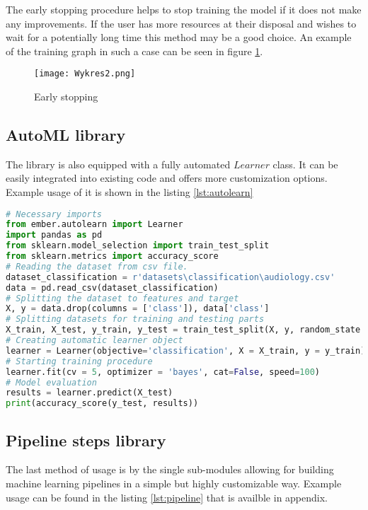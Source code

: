 \documentclass[a4paper,twoside,12pt]{book}
\begin{document}
The early stopping procedure helps to stop training the model if it does not make any improvements. If the user has more resources at their disposal and wishes to wait for a potentially long time this method may be a good choice. An example of the training graph in such a case can be seen in figure \ref{fig:early}.

\begin{figure}[!htb]
    \centering
    \texttt{[image: Wykres2.png]}
    \caption{Early stopping}
    \label{fig:early}
\end{figure}
\newpage
\subsection{AutoML library}

The library is also equipped with a fully automated $Learner$ class. It can be easily integrated into existing code and offers more customization options. Example usage of it is shown in the listing \ref{lst:autolearn}

\begin{lstlisting}[language=Python,caption={Using automatic learner},label={lst:autolearn}]
# Necessary imports
from ember.autolearn import Learner
import pandas as pd
from sklearn.model_selection import train_test_split
from sklearn.metrics import accuracy_score
# Reading the dataset from csv file.
dataset_classification = r'datasets\classification\audiology.csv'
data = pd.read_csv(dataset_classification)
# Splitting the dataset to features and target
X, y = data.drop(columns = ['class']), data['class']
# Splitting datasets for training and testing parts
X_train, X_test, y_train, y_test = train_test_split(X, y, random_state = 42, test_size = 20)
# Creating automatic learner object
learner = Learner(objective='classification', X = X_train, y = y_train)
# Starting training procedure
learner.fit(cv = 5, optimizer = 'bayes', cat=False, speed=100)
# Model evaluation
results = learner.predict(X_test)
print(accuracy_score(y_test, results))
\end{lstlisting}
\subsection{Pipeline steps library}

The last method of usage is by the single sub-modules allowing for building machine learning pipelines in a simple but highly customizable way.
Example usage can be found in the listing \ref{lst:pipeline} that is availble in appendix.
\end{document}
